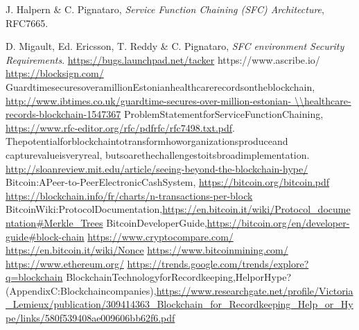 \renewcommand{\bibname}{References}
\cleardoublepage
{}
{}
\begin{thebibliography}{99}

  J. Halpern \& C. Pignataro,
  \emph{Service Function Chaining (SFC) Architecture}, RFC7665.

D. Migault, Ed. Ericsson, T. Reddy \& C. Pignataro, 
  \emph{ SFC environment Security Requirements}.
\url{https://bugs.launchpad.net/tacker}
{https://www.ascribe.io/} 
\url{https://blocksign.com/}
Guardtime\enspace secures\enspace over\enspace a\enspace million\enspace Estonian\enspace healthcare\enspace records\enspace on\enspace the\enspace blockchain, \url{http://www.ibtimes.co.uk/guardtime-secures-over-million-estonian-
\\healthcare-records-blockchain-1547367}
Problem\enspace Statement\enspace for\enspace Service\enspace Function\enspace Chaining, \\ \url{https://www.rfc-editor.org/rfc/pdfrfc/rfc7498.txt.pdf}.
The\enspace potential\enspace for\enspace blockchain\enspace to\enspace transform\enspace how\enspace organizations\enspace produce\enspace and \\capture\enspace value\enspace is\enspace very\enspace real\enspace, but\enspace so\enspace are\enspace the\enspace challenges\enspace to\enspace its\enspace broad\enspace implementation. \url{http://sloanreview.mit.edu/article/seeing-beyond-the-blockchain-hype/} 
Bitcoin:\enspace A\enspace Peer-to-Peer\enspace Electronic\enspace Cash\enspace System, \url{https://bitcoin.org/bitcoin.pdf}
\url{https://blockchain.info/fr/charts/n-transactions-per-block} 
Bitcoin\enspace Wiki:\enspace Protocol\enspace Documentation,\enspace \url{https://en.bitcoin.it/wiki/Protocol_documentation#Merkle_Trees} 
Bitcoin\enspace Developer\enspace Guide,\enspace \url{https://bitcoin.org/en/developer-guide#block-chain} 
\url{https://www.cryptocompare.com/}
\url{https://en.bitcoin.it/wiki/Nonce}
\url{https://www.bitcoinmining.com/}
\url{https://www.ethereum.org/}
\url{https://trends.google.com/trends/explore?q=blockchain}
 Blockchain\enspace Technology\enspace for\enspace Recordkeeping,\enspace Help\enspace or\enspace Hype\enspace ?\\ (Appendix\enspace C:\enspace Blockchain\enspace companies),\newline \url{https://www.researchgate.net/profile/Victoria_Lemieux/publication/309414363_Blockchain_for_Recordkeeping_Help_or_Hype/links/580f539408ae009606bb62f6.pdf}

\end{thebibliography}
